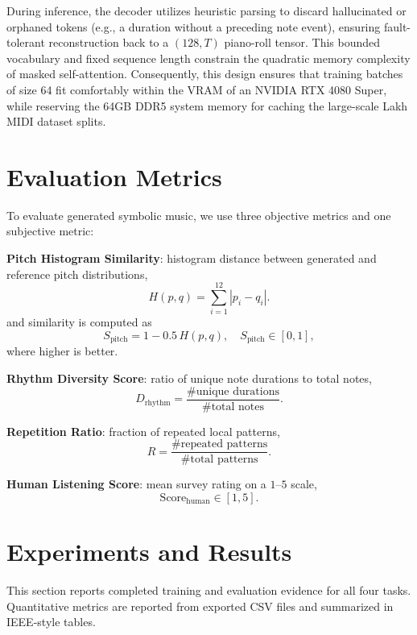 \documentclass[conference]{IEEEtran}
\begin{document}
During inference, the decoder utilizes heuristic parsing to discard hallucinated or orphaned tokens (e.g., a duration without a preceding note event), ensuring fault-tolerant reconstruction back to a $(128, T)$ piano-roll tensor. This bounded vocabulary and fixed sequence length constrain the quadratic memory complexity of masked self-attention. Consequently, this design ensures that training batches of size 64 fit comfortably within the VRAM of an NVIDIA RTX 4080 Super, while reserving the 64GB DDR5 system memory for caching the large-scale Lakh MIDI dataset splits.

\section{Evaluation Metrics}
To evaluate generated symbolic music, we use three objective metrics and one subjective metric:

\textbf{Pitch Histogram Similarity}: histogram distance between generated and reference pitch distributions,
\begin{equation}
H(p,q)=\sum_{i=1}^{12}|p_i-q_i|.
\end{equation}
and similarity is computed as
\begin{equation}
S_{\text{pitch}} = 1 - 0.5\,H(p,q),\quad S_{\text{pitch}}\in[0,1],
\end{equation}
where higher is better.

\textbf{Rhythm Diversity Score}: ratio of unique note durations to total notes,
\begin{equation}
D_{\text{rhythm}}=\frac{\#\text{unique durations}}{\#\text{total notes}}.
\end{equation}

\textbf{Repetition Ratio}: fraction of repeated local patterns,
\begin{equation}
R=\frac{\#\text{repeated patterns}}{\#\text{total patterns}}.
\end{equation}

\textbf{Human Listening Score}: mean survey rating on a $1$--$5$ scale,
\begin{equation}
\text{Score}_{\text{human}} \in [1,5].
\end{equation}

\section{Experiments and Results}
This section reports completed training and evaluation evidence for all four tasks. Quantitative metrics are reported from exported CSV files and summarized in IEEE-style tables.
\end{document}
